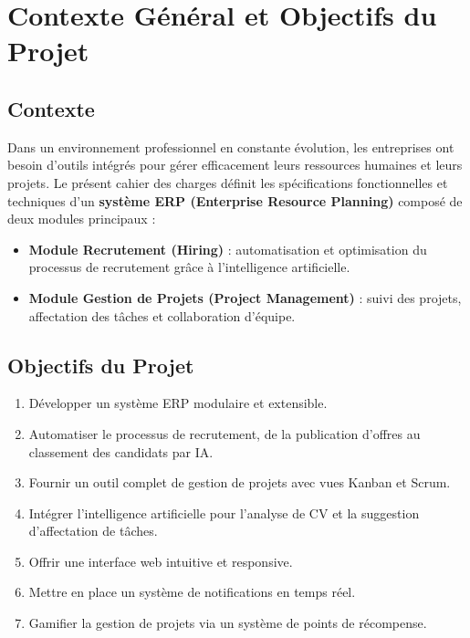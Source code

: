 \documentclass[11pt,a4paper]{report}
\begin{document}
\chapter{Contexte Général et Objectifs du Projet}
\section{Contexte}
Dans un environnement professionnel en constante évolution, les entreprises ont besoin d'outils intégrés pour gérer efficacement leurs ressources humaines et leurs projets. Le présent cahier des charges définit les spécifications fonctionnelles et techniques d'un \textbf{système ERP (Enterprise Resource Planning)} composé de deux modules principaux :
\begin{itemize}
    \item \textbf{Module Recrutement (Hiring)} : automatisation et optimisation du processus de recrutement grâce à l'intelligence artificielle.
    \item \textbf{Module Gestion de Projets (Project Management)} : suivi des projets, affectation des tâches et collaboration d'équipe.
\end{itemize}

\section{Objectifs du Projet}
\begin{tcolorbox}[enhanced, colback=lightgray, colframe=primarycolor, arc=3mm, boxrule=1pt, title={\color{white} Objectifs Principaux}, fonttitle=\bfseries, coltitle=white, colbacktitle=primarycolor]
    \begin{enumerate}[label=\textcolor{primarycolor}{\arabic*.}]
        \item Développer un système ERP modulaire et extensible.
        \item Automatiser le processus de recrutement, de la publication d'offres au classement des candidats par IA.
        \item Fournir un outil complet de gestion de projets avec vues Kanban et Scrum.
        \item Intégrer l'intelligence artificielle pour l'analyse de CV et la suggestion d'affectation de tâches.
        \item Offrir une interface web intuitive et responsive.
        \item Mettre en place un système de notifications en temps réel.
        \item Gamifier la gestion de projets via un système de points de récompense.
    \end{enumerate}
\end{tcolorbox}
\end{document}

